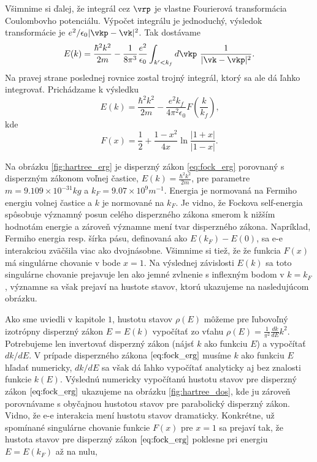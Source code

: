 Všimnime si ďalej, že integrál cez $\vrp$ je vlastne Fourierová transformácia Coulombovho potenciálu. Výpočet integrálu je jednoduchý, výsledok transformácie je $e^2/\epsilon_0|\vkp-\vk|^2$. Tak dostávame
\begin{equation}
 \label{eq:fock_plane2}
  E(k)=\frac{\hbar^2 k^2}{2m}-\frac{1}{8\pi^3} \frac{e^2}{\epsilon_0} \int_{k'<k_f} d\vkp \ \frac{1}{|\vk-\vkp|^2}\text{.}
\end{equation}
Na pravej strane poslednej rovnice zostal trojný integrál, ktorý sa ale dá ľahko integrovať. Prichádzame k výsledku \cite{Mermin}
\begin{equation}
\label{eq:fock_erg}
 E(k)=\frac{\hbar^2 k^2}{2m}-  \frac{e^2 k_f}{4\pi^2\epsilon_0} F(\frac{k}{k_f}) \text{,}
\end{equation}
kde
\begin{equation}
 \label{eq:fock_fx}
 F(x)=\frac{1}{2}+\frac{1-x^2}{4x}\ln{\frac{|1+x|}{|1-x|}} \text{.}
\end{equation}

Na obrázku \ref{fig:hartree_erg} je disperzný zákon \eqref{eq:fock_erg} porovnaný s disperzným zákonom voľnej častice, $E(k)=\frac{\hbar^2 k^2}{2m}$, pre parametre $m = 9.109 \times 10^{-31} kg$ a $k_F = 9.07 \times 10^{9} m^{-1}$.
Energia je normovaná na Fermiho energiu volnej častice a $k$ je normované na $k_F$.  
Je vidno, že Fockova self-energia spôsobuje významný posun celého disperzného zákona smerom k nižším hodnotám energie a zároveň významne
mení tvar disperzného zákona.  Napríklad, Fermiho energia resp. šírka pásu, definovaná ako  $E(k_F)-E(0)$, sa e-e interakciou zväčšila viac ako dvojnásobne.
Všimnime si tiež, že že funkcia $F(x)$ má singulárne chovanie v bode $x=1$. Na výslednej závislosti $E(k)$ sa toto singulárne chovanie prejavuje len ako jemné zvlnenie s inflexným bodom v $k = k_F$,
významne sa však prejaví na hustote stavov, ktorú ukazujeme na nasledujúcom obrázku.

Ako sme uviedli v kapitole $1$, hustotu stavov $\rho(E)$ môžeme  pre ľubovoľný izotrópny disperzný zákon $E=E(k)$ vypočítať zo vťahu $\rho(E)=\frac{1}{\pi^2} \frac{dk}{dE} k^2$. Potrebujeme len invertovať
disperzný zákon (nájsť $k$ ako funkciu $E$) a vypočítať $dk/dE$. V prípade disperzného zákona  $\eqref{eq:fock_erg}$ musíme $k$ ako funkciu $E$ hľadať numericky, $dk/dE$ sa však dá ľahko vypočítať 
analyticky aj bez znalosti funkcie $k(E)$. Výslednú numericky vypočítanú hustotu stavov pre disperzný zákon $\eqref{eq:fock_erg}$ ukazujeme na obrázku \ref{fig:hartree_dos}, kde ju zároveň porovnávame s obyčajnou hustotou stavov pre parabolický disperzný
zákon. Vidno, že e-e interakcia mení hustotu stavov dramaticky. Konkrétne, už spomínané singulárne chovanie funkcie $F(x)$ pre $x=1$ sa prejaví tak, že hustota stavov pre disperzný zákon $\eqref{eq:fock_erg}$  
poklesne pri energiu $E=E(k_F)$ až na nulu,

